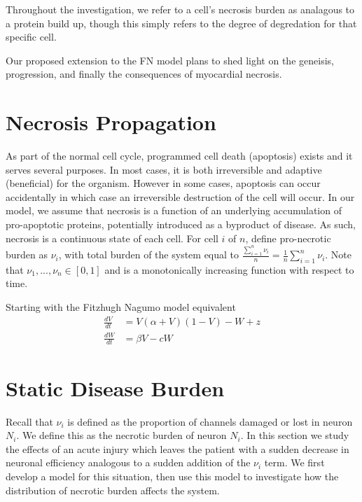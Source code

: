 \documentclass[11pt]{report}
\begin{document}
Throughout the investigation, we refer to a cell's necrosis burden as analagous to a protein build up, though this simply refers to the degree of degredation for that specific cell.

Our proposed extension to the FN model plans to shed light on the geneisis, progression, and finally the consequences of myocardial necrosis. 

\section{Necrosis Propagation}

As part of the normal cell cycle, programmed cell death (apoptosis) exists and it serves several purposes. In most cases, it is both irreversible and adaptive (beneficial) for the organism. However in some cases, apoptosis can occur accidentally in which case an irreversible destruction of the cell will occur. In our model, we assume that necrosis is a function of an underlying accumulation of pro-apoptotic proteins, potentially introduced as a byproduct of disease. As such, necrosis is a continuous state of each cell. For cell $i$ of $n$, define pro-necrotic burden as $\nu_i$, with total burden of the system equal to $\frac{\sum^n_{i=1} \nu_i}{n}=\frac{1}{n} \sum^n_{i=1} \nu_i$. Note that $\nu_{1}, ..., \nu_{n} \in [0,1]$ and is a monotonically increasing function with respect to time. 

Starting with the Fitzhugh Nagumo model equivalent
\begin{align}
\frac{dV}{dt} &= V(\alpha +V)(1-V) -W +z\\
\frac{dW}{dt} &= \beta V - cW
\end{align}



\section{Static Disease Burden} %
\label{sub:static_disease_burden}

Recall that $\nu_i$ is defined as the proportion of channels damaged or lost in neuron $N_i$. We define this as the necrotic burden of neuron $N_i$. In this section we study the effects of an acute injury which leaves the patient with a sudden decrease in neuronal efficiency analogous to a sudden addition of the $\nu_i$ term. We first develop a model for this situation, then use this model to investigate how the distribution of necrotic burden affects the system.
\end{document}
